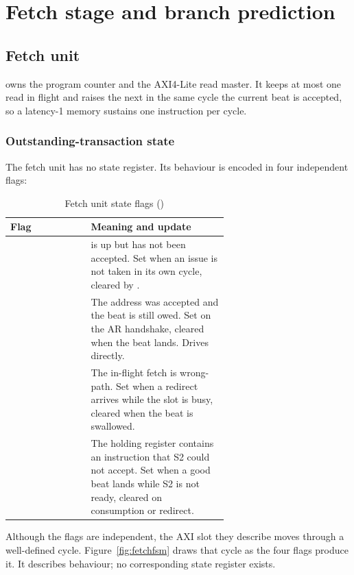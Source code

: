 \chapter{Fetch stage and branch prediction}
\label{ch:fetch}

\section{Fetch unit}

 owns the program counter and the  AXI4-Lite
read master. It keeps at most one read in flight and raises the next 
in the same cycle the current  beat is accepted, so a latency-1 memory
sustains one instruction per cycle.

\subsection{Outstanding-transaction state}

The fetch unit has no state register. Its behaviour is encoded in four
independent flags:

\begin{table}[H]
\centering
\caption{Fetch unit state flags ()}
\label{tab:fetchflags}
\begin{tabular}{@{}lL{0.63\linewidth}@{}}
\toprule
\textbf{Flag} & \textbf{Meaning and update} \\
\midrule
{} &  is up but has not been accepted. Set when an issue is
  not taken in its own cycle, cleared by . \\
    & The address was accepted and the  beat is still owed. Set on the
  AR handshake, cleared when the beat lands. Drives  directly. \\
     & The in-flight fetch is wrong-path. Set when a redirect arrives while the
  slot is busy, cleared when the beat is swallowed. \\
 & The holding register contains an instruction that S2 could not accept.
  Set when a good beat lands while S2 is not ready, cleared on consumption or redirect. \\
\bottomrule
\end{tabular}
\end{table}

Although the flags are independent, the AXI slot they describe moves through a
well-defined cycle. Figure~\ref{fig:fetchfsm} draws that cycle as the four flags
produce it. It describes behaviour; no corresponding state register exists.

